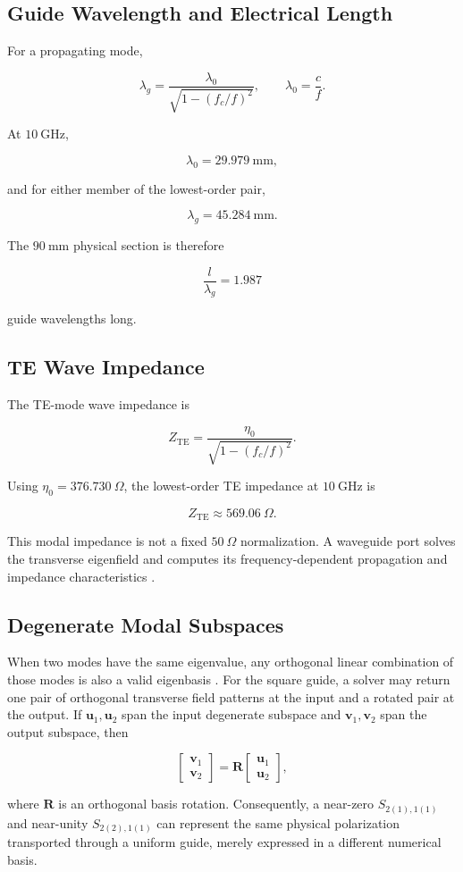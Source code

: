 \subsection{Guide Wavelength and Electrical Length}

For a propagating mode,

\[
\lambda_g
=
\frac{\lambda_0}{
\sqrt{1-\left(f_c/f\right)^2}
},
\qquad
\lambda_0=\frac{c}{f}.
\]

At \(10~\mathrm{GHz}\),

\[
\lambda_0=29.979~\mathrm{mm},
\]

and for either member of the lowest-order pair,

\[
\lambda_g=45.284~\mathrm{mm}.
\]

The \(90~\mathrm{mm}\) physical section is therefore

\[
\frac{l}{\lambda_g}=1.987
\]

guide wavelengths long.

\subsection{TE Wave Impedance}

The TE-mode wave impedance is

\[
Z_{\mathrm{TE}}
=
\frac{\eta_0}{
\sqrt{1-\left(f_c/f\right)^2}
}.
\]

Using \(\eta_0=376.730~\Omega\), the lowest-order TE impedance at \(10~\mathrm{GHz}\) is

\[
Z_{\mathrm{TE}}\approx569.06~\Omega.
\]

This modal impedance is not a fixed \(50~\Omega\) normalization. A waveguide port solves the transverse eigenfield and computes its frequency-dependent propagation and impedance characteristics \cite{simulia_learning_tutorials,simulia_rf_components}.

\subsection{Degenerate Modal Subspaces}

When two modes have the same eigenvalue, any orthogonal linear combination of those modes is also a valid eigenbasis \cite{pozar2011microwave}. For the square guide, a solver may return one pair of orthogonal transverse field patterns at the input and a rotated pair at the output. If \(\mathbf{u}_1,\mathbf{u}_2\) span the input degenerate subspace and \(\mathbf{v}_1,\mathbf{v}_2\) span the output subspace, then

\[
\begin{bmatrix}
\mathbf{v}_1\\
\mathbf{v}_2
\end{bmatrix}
=
\mathbf{R}
\begin{bmatrix}
\mathbf{u}_1\\
\mathbf{u}_2
\end{bmatrix},
\]

where \(\mathbf{R}\) is an orthogonal basis rotation. Consequently, a near-zero \(S_{2(1),1(1)}\) and near-unity \(S_{2(2),1(1)}\) can represent the same physical polarization transported through a uniform guide, merely expressed in a different numerical basis.
